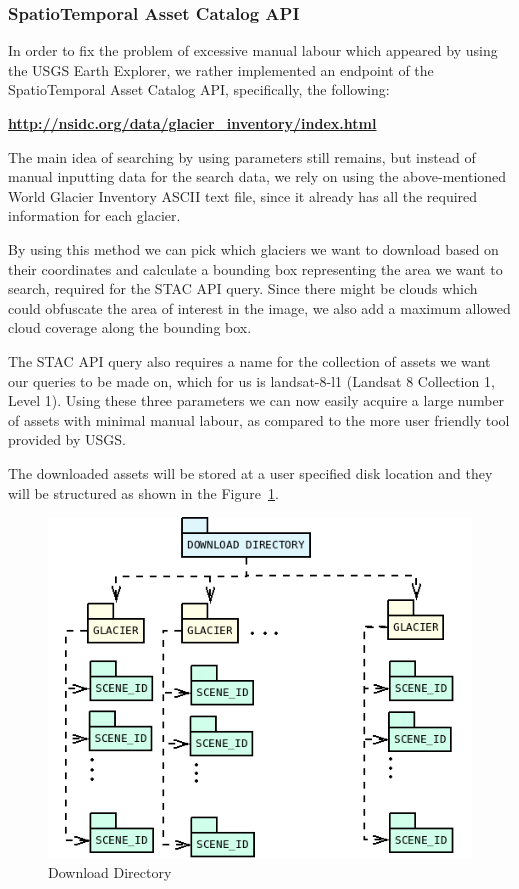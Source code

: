 \documentclass[12pt, a4paper]{report}
\begin{document}
	\subsubsection{SpatioTemporal Asset Catalog API}
	\label{seq:STAC}
	
	\par In order to fix the problem of excessive manual labour which appeared by using the USGS Earth Explorer, we rather implemented an endpoint of the SpatioTemporal Asset Catalog API, specifically, the following:
	
	\textbf{\url{http://nsidc.org/data/glacier_inventory/index.html}} \cite{STAC}
	
	\par The main idea of searching by using parameters still remains, but instead of manual inputting data for the search data, we rely on using the above-mentioned World Glacier Inventory ASCII text file, since it already has all the required information for each glacier.
	
	\par By using this method we can pick which glaciers we want to download based on their coordinates and calculate a bounding box representing the area we want to search, required for the STAC API query. Since there might be clouds which could obfuscate the area of interest in the image, we also add a maximum allowed cloud coverage along the bounding box.
	
	\par The STAC API query also requires a name for the collection of assets we want our queries to be made on, which for us is landsat-8-l1 (Landsat 8 Collection 1, Level 1). Using these three parameters we can now easily acquire a large number of assets with minimal manual labour, as compared to the more user friendly tool provided by USGS.
	
	\par The downloaded assets will be stored at a user specified disk location and they will be structured as shown in the Figure~\ref{fig:DownloadDirectory}.
	\begin{figure}[h]
		\centering
		\includegraphics[scale=0.4]{../images/DownloadDirectory.png}
		\caption{Download Directory}
		\label{fig:DownloadDirectory}
	\end{figure}
	
\end{document}
